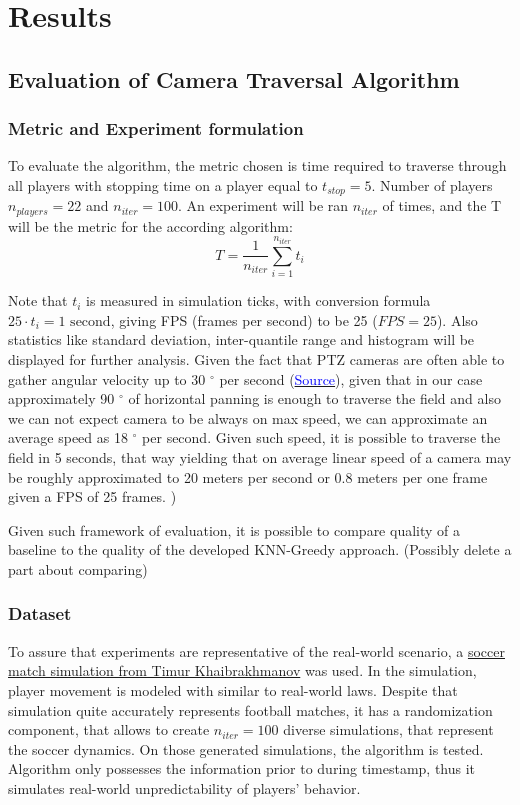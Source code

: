 \chapter{Results}

\section{Evaluation of Camera Traversal Algorithm }
\subsection{Metric and Experiment formulation}
To evaluate the algorithm, the metric chosen is time required to traverse through all players with stopping time on a player equal to $t_{stop} = 5$. Number of players $n_{players} = 22$ and $n_{iter} = 100$. An experiment will be ran $n_{iter}$ of times, and the T will be the metric for the according algorithm:
$$
T=\frac{1}{n_{iter}}\sum\limits_{i=1}^{n_{iter}} t_{i}
$$

Note that $t_{i}$ is measured in simulation ticks, with conversion formula $25  \cdot t_{i} = 1 \text{ second}$, giving FPS (frames per second) to be 25 ($FPS=25$). Also statistics like standard deviation, inter-quantile range  and histogram will be displayed for further analysis. Given the fact that PTZ cameras are often able to gather angular velocity up to 30 $^{\circ}$ per second (\href{https://www.bit-cctv.com/products/outdoor-mini-pan-tilt-positioner-head.html}{\textcolor{blue}{Source}}), given that in our case approximately 90 $^{\circ}$ of horizontal panning is enough to traverse the field and also we can not expect camera to be always on max speed, we can approximate an average speed as 18 $^{\circ}$ per second. Given such speed, it is possible to traverse the field in 5 seconds, that way yielding that on average linear speed of a camera may be roughly approximated to 20 meters per second or 0.8 meters per one frame given a FPS of 25 frames.
) 

Given such framework of evaluation, it is possible to compare quality of a baseline to the quality of the developed KNN-Greedy approach. {\color{purple}(Possibly delete a part about comparing)}

\subsection{Dataset}
To assure that experiments are representative of the real-world scenario, a  \href{https://github.com/mikecarti/hse-cam2023/tree/main/simulation}{soccer match simulation from Timur Khaibrakhmanov} was used. In the simulation, player movement is modeled with similar to real-world laws. Despite that simulation quite accurately represents football matches, it has a randomization component, that allows to create $n_{iter}=100$ diverse simulations, that represent the soccer dynamics. On those generated simulations, the algorithm is tested. Algorithm only possesses the information prior to during timestamp, thus it simulates real-world unpredictability of players' behavior.

